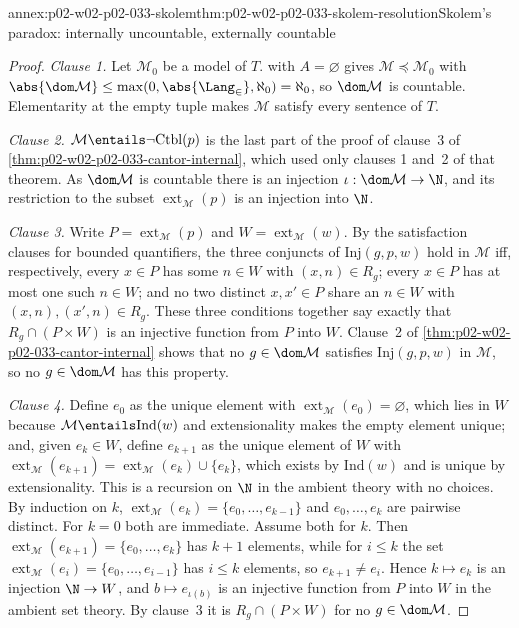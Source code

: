 \begin{annexitem}{annex:p02-w02-p02-033-skolem}{thm:p02-w02-p02-033-skolem-resolution}{Skolem's paradox: internally uncountable, externally countable}
\begin{proof}
\emph{Clause 1.}  Let \(\mathcal M_0\) be a model of \(T\).
 with \(A=\varnothing\) gives
\(\mathcal M\preccurlyeq\mathcal M_0\) with
\(\abs{\dom\mathcal M}\leq\max(0,\abs{\Lang_{\in}},\aleph_0)=\aleph_0\), so
\(\dom\mathcal M\) is countable.  Elementarity at the empty tuple makes
\(\mathcal M\) satisfy every sentence of \(T\).

\emph{Clause 2.}  \(\mathcal M\entails\neg\mathrm{Ctbl}(p)\) is the last
part of the proof of clause~3 of
\cref{thm:p02-w02-p02-033-cantor-internal}, which used only clauses 1 and~2
of that theorem.  As \(\dom\mathcal M\) is countable there is an injection
\(\iota:\dom\mathcal M\to\N\), and its restriction to the subset
\(\operatorname{ext}_{\mathcal M}(p)\) is an injection into \(\N\).

\emph{Clause 3.}  Write \(P=\operatorname{ext}_{\mathcal M}(p)\) and
\(W=\operatorname{ext}_{\mathcal M}(w)\).  By the satisfaction clauses for
bounded quantifiers, the three conjuncts of \(\mathrm{Inj}(g,p,w)\) hold in
\(\mathcal M\) iff, respectively, every \(x\in P\) has some \(n\in W\) with
\((x,n)\in R_g\); every \(x\in P\) has at most one such \(n\in W\); and no
two distinct \(x,x'\in P\) share an \(n\in W\) with \((x,n),(x',n)\in R_g\).
These three conditions together say exactly that
\(R_g\cap(P\times W)\) is an injective function from \(P\) into \(W\).
Clause~2 of \cref{thm:p02-w02-p02-033-cantor-internal} shows that no
\(g\in\dom\mathcal M\) satisfies \(\mathrm{Inj}(g,p,w)\) in \(\mathcal M\),
so no \(g\in\dom\mathcal M\) has this property.

\emph{Clause 4.}  Define \(e_0\) as the unique element with
\(\operatorname{ext}_{\mathcal M}(e_0)=\varnothing\), which lies in \(W\)
because \(\mathcal M\entails\mathrm{Ind}(w)\) and extensionality makes the
empty element unique; and, given \(e_k\in W\), define \(e_{k+1}\) as the
unique element of \(W\) with
\(\operatorname{ext}_{\mathcal M}(e_{k+1})=
\operatorname{ext}_{\mathcal M}(e_k)\cup\{e_k\}\), which exists by
\(\mathrm{Ind}(w)\) and is unique by extensionality.  This is a recursion on
\(\N\) in the ambient theory with no choices.  By induction on \(k\),
\(\operatorname{ext}_{\mathcal M}(e_k)=\{e_0,\ldots,e_{k-1}\}\) and
\(e_0,\ldots,e_k\) are pairwise distinct.  For \(k=0\) both are immediate.
Assume both for \(k\).  Then
\(\operatorname{ext}_{\mathcal M}(e_{k+1})=\{e_0,\ldots,e_k\}\) has
\(k+1\) elements, while for \(i\leq k\) the set
\(\operatorname{ext}_{\mathcal M}(e_i)=\{e_0,\ldots,e_{i-1}\}\) has
\(i\leq k\) elements, so \(e_{k+1}\ne e_i\).  Hence \(k\mapsto e_k\) is an
injection \(\N\to W\), and \(b\mapsto e_{\iota(b)}\) is an injective
function from \(P\) into \(W\) in the ambient set theory.  By clause~3 it is
\(R_g\cap(P\times W)\) for no \(g\in\dom\mathcal M\).
\end{proof}
\end{annexitem}

